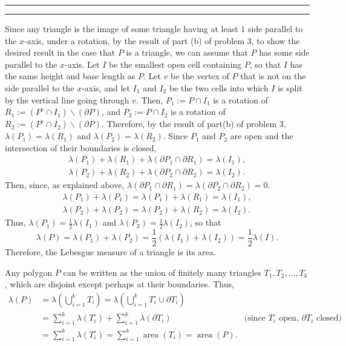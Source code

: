 \documentclass[11pt]{article}
\newcounter{questionCounter}
\newcounter{partCounter}[questionCounter]
\newenvironment{question}[2][\arabic{questionCounter}]{%
    \setcounter{partCounter}{0}%
    \vspace{.25in} \hrule \vspace{0.5em}%
        \noindent{\bf #2}%
    \vspace{0.8em} \hrule \vspace{.10in}%
    \addtocounter{questionCounter}{1}%
}{}
\newcommand{\area}{\operatorname{area}}
\newcommand{\sminus}{\backslash}
\begin{document}
\begin{question}{Problem 2}
\begin{enumerate}[(a)]
Since any triangle is the image of some triangle having at least $1$
side parallel to the $x$-axis, under a rotation, by the result of part (b) of
problem 3, to show the desired result in the case that $P$ is a triangle, we
can assume that $P$ has some side parallel to the $x$-axis. Let $I$ be the
smallest open cell containing $P$, so that $I$ has the same height and base
length as $P$. Let $v$ be the vertex of $P$ that is not on the side parallel
to the $x$-axis, and let $I_1$ and $I_2$ be the two cells into which $I$ is
split by the vertical line going through $v$. Then, $P_1 := P \cap I_1$ is a rotation
of $R_1 := (P^c \cap I_1)\sminus(\partial P)$, and $P_2 := P \cap I_2$ is a rotation
of $R_2 := (P^c \cap I_2)\sminus(\partial P)$. Therefore, by the result of
part(b) of problem 3,
$\lambda(P_1) = \lambda(R_1)$ and
$\lambda(P_2) = \lambda(R_2)$.
Since $P_1$ and $P_2$ are open and the intersection of their boundaries is closed,
\begin{align*}
\lambda(P_1) + \lambda(R_1) + \lambda(\partial P_1 \cap \partial R_1) = \lambda(I_1),\\
\lambda(P_2) + \lambda(R_2) + \lambda(\partial P_2 \cap \partial R_2) = \lambda(I_2).
\end{align*}
Then, since, as explained above,
$\lambda(\partial P_1 \cap \partial R_1) = \lambda(\partial P_2 \cap \partial R_2) = 0$.
\begin{align*}
\lambda(P_1) + \lambda(P_1) = \lambda(P_1) + \lambda(R_1) = \lambda(I_1),\\
\lambda(P_2) + \lambda(P_2) = \lambda(P_2) + \lambda(R_2) = \lambda(I_2).
\end{align*}
Thus, $\lambda(P_1) = \frac12\lambda(I_1)$ and $\lambda(P_2) = \frac12\lambda(I_2)$,
so that
\[\lambda(P) = \lambda(P_1) + \lambda(P_2) = \frac12(\lambda(I_1) + \lambda(I_2)) = \frac12\lambda(I).\]
Therefore, the Lebesgue measure of a triangle is its area.

Any polygon $P$ can be written as the union of finitely many triangles
$T_1,T_2,\ldots,T_k$, which are disjoint except perhaps at their boundaries.
Thus,
\begin{align*}
\lambda(P)
 & = \lambda\left(\bigcup_{i = 1}^k T_i\right)
   = \lambda\left(\bigcup_{i = 1}^k T_i^{\circ} \cup \partial T_i\right) & \\
 & = \sum_{i = 1}^k \lambda(T_i^{\circ})
   + \sum_{i = 1}^k \lambda(\partial T_i)                                &
                  \mbox{(since $T_i^{\circ}$ open, $\partial T_i$ closed)} \\
 & = \sum_{i = 1}^k \lambda(T_i^{\circ})
   = \sum_{i = 1}^k \area(T_i)
   = \area(P).
\end{align*}

\end{enumerate}
\end{question}
\end{document}

